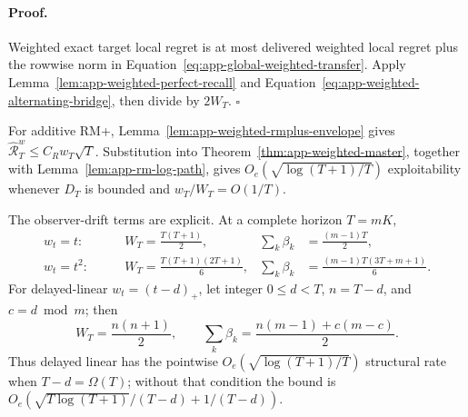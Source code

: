 \paragraph{Proof.}
Weighted exact target local regret is at most delivered weighted local regret
plus the rowwise norm in
Equation~\ref{eq:app-global-weighted-transfer}.  Apply
Lemma~\ref{lem:app-weighted-perfect-recall} and
Equation~\ref{eq:app-weighted-alternating-bridge}, then divide by $2W_T$.
\hfill$\square$

For additive RM+,
Lemma~\ref{lem:app-weighted-rmplus-envelope} gives
$\widehat{\mathcal R}_T^w\le C_Rw_T\sqrt T$.  Substitution into
Theorem~\ref{thm:app-weighted-master}, together with
Lemma~\ref{lem:app-rm-log-path}, gives
$O_e(\sqrt{\log(T+1)/T})$ exploitability whenever $D_T$ is bounded and
$w_T/W_T=O(1/T)$.

The observer-drift terms are explicit.  At a complete horizon $T=mK$,
\begin{align}
 w_t=t:\qquad &W_T=\frac{T(T+1)}2,&
 \sum_k\beta_k&=\frac{(m-1)T}2,\label{eq:app-linear-backlog}\\
 w_t=t^2:\qquad &W_T=\frac{T(T+1)(2T+1)}6,&
 \sum_k\beta_k&=\frac{(m-1)T(3T+m+1)}6.
\label{eq:app-quadratic-backlog}
\end{align}
For delayed-linear $w_t=(t-d)_+$, let integer $0\le d<T$,
$n=T-d$, and $c=d\bmod m$; then
\begin{equation}
 W_T=\frac{n(n+1)}2,\qquad
 \sum_k\beta_k=\frac{n(m-1)+c(m-c)}2.
\label{eq:app-delayed-linear-backlog}
\end{equation}
Thus delayed linear has the pointwise
$O_e(\sqrt{\log(T+1)/T})$ structural rate when $T-d=\Omega(T)$; without that
condition the bound is
$O_e(\sqrt{T\log(T+1)}/(T-d)+1/(T-d))$.

